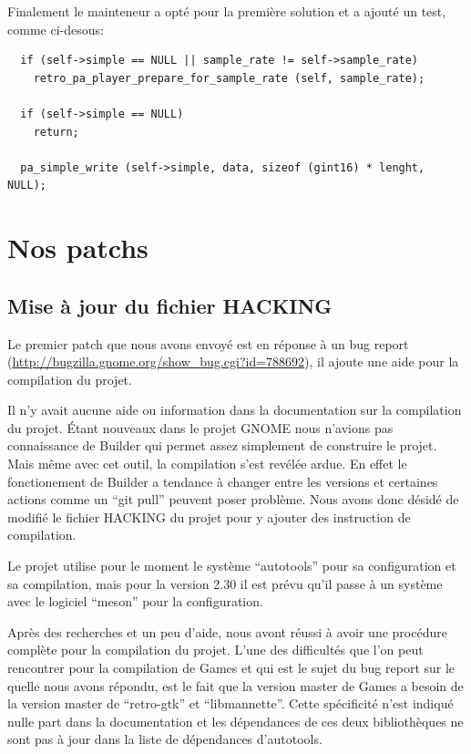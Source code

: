 \documentclass[12pt]{report}
\begin{document}
Finalement le mainteneur a opté pour la première solution et a ajouté un test, comme
ci-desous:
\begin{verbatim}
  if (self->simple == NULL || sample_rate != self->sample_rate)
    retro_pa_player_prepare_for_sample_rate (self, sample_rate);

  if (self->simple == NULL)
    return;

  pa_simple_write (self->simple, data, sizeof (gint16) * lenght, NULL);
\end{verbatim}

\section{Nos patchs}
\subsection{Mise à jour du fichier HACKING}
\label{HACKING}
Le premier patch que nous avons envoyé est en réponse à un bug report
(\url{http://bugzilla.gnome.org/show_bug.cgi?id=788692}), il ajoute une aide
pour la compilation du projet.

Il n'y avait aucune aide ou information dans la documentation sur la compilation
du projet. Étant nouveaux dans le projet GNOME nous n'avions pas connaissance de 
Builder qui permet assez simplement de construire le projet. Mais même avec cet
outil, la compilation s'est revélée ardue. En effet le fonctionement de Builder a
tendance à changer entre les versions et certaines actions comme un ``git pull''
peuvent poser problème. Nous avons donc désidé de modifié le fichier HACKING du
projet pour y ajouter des instruction de compilation.

Le projet utilise pour le moment le système ``autotools'' pour sa configuration et 
sa compilation, mais pour la version 2.30 il est prévu qu'il passe à un système
avec le logiciel ``meson'' pour la configuration.

Après des recherches et un peu d'aide, nous avont réussi à avoir une procédure
complète pour la compilation du projet. L'une des difficultés que l'on peut
rencontrer pour la compilation de Games et qui est le sujet du bug report sur le
quelle nous avons répondu, est le fait que la version master de Games a besoin de
la version master de ``retro-gtk'' et ``libmannette''. Cette spécificité n'est
indiqué nulle part dans la documentation et les dépendances de ces deux
bibliothèques ne sont pas à jour dans la liste de dépendances d'autotools.
\end{document}
